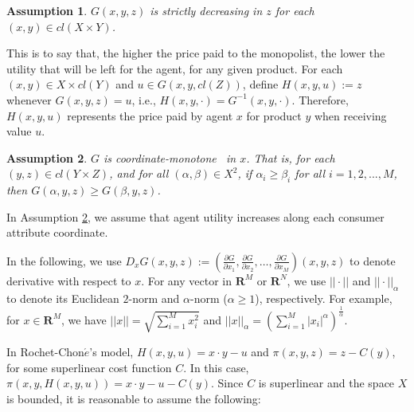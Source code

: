 \documentclass[a4paper, 11pt]{amsart}
\numberwithin{equation}{section}
\theoremstyle{plain}
\newtheorem{assumption}{Assumption}
\theoremstyle{definition}
\theoremstyle{remark}
\newcommand{\R}{\mathbf{R}}
\begin{document}
\begin{comment}
	{ is the so-called twist condition which is the similar/dual to but much less restrictive than the generalized single crossing condition proposed by McAfee-McMillan \cite{McAfeeMcMillan88}. Comparing to Figalli-Kim-McCann \cite{FigalliKimMcCann11}}\medskip
\end{comment}


\begin{assumption}\label{assmp:Gdecreasing}
	$G(x,y,z)$ is strictly decreasing in $z$ %
	for each $(x,y) \in cl(X \times Y)$.
\end{assumption}


This is to say that, the higher the price paid to the monopolist, the lower the utility that will be left for the agent, for any given product. %
For each $(x, y) \in X\times cl(Y)$ %
and $u\in G(x,y, cl(Z))$, define $H(x,y,u) := z$ %
whenever $G(x,y,z) = u$, i.e., $H(x, y, \cdot)= G^{-1}(x,y,\cdot)$. Therefore, $H(x,y,u)$ represents the price paid by agent $x$ for product $y$ when receiving value $u$.\medskip

\begin{assumption}\label{assmp:Gcoordinate-monotone}
	$G$ is coordinate-monotone
	~in $x$. That is, for each $(y,z)\in cl(Y\times Z)$, and for all $ (\alpha, \beta) \in X^2$, if $\alpha_i\ge \beta_i$ for all $ i=1,2,...,M$, then $G(\alpha,y,z)\ge G(\beta, y,z)$.
\end{assumption}


In Assumption \ref{assmp:Gcoordinate-monotone}, we assume that agent utility increases along each consumer attribute coordinate.\medskip



 {In the following, we use  $D_x G(x,y,z) := (\frac{\partial G}{\partial x_1}, \frac{\partial G}{\partial x_2}, \dots, \frac{\partial G}{\partial x_M})(x,y,z)$ to denote derivative with respect to $x$. For any vector in $\R^M$ or $\R^N$, we use $||\cdot||$ and $||\cdot||_{\alpha}$ to denote its Euclidean  $2$-norm and $\alpha$-norm ($\alpha \ge 1$), respectively. For example, for $x\in \R^M$, we have $||x|| = \sqrt{\sum_{i=1}^{M} x_i^2}$ and $||x||_{\alpha} = (\sum_{i=1}^{M} |x_i|^{\alpha})^{\frac{1}{\alpha}}$.}\medskip
 
In Rochet-Chon$\acute{e}$'s model, $H(x,y,u) = x\cdot y -u$ and $\pi(x,y,z) = z-C(y)$, for some superlinear cost function $C$. In this case, $\pi(x,y,H(x,y,u)) = x\cdot y -u -C(y)$. Since $C$ is superlinear and the space $X$ is bounded, it is reasonable to assume the following:\medskip
\end{document}
